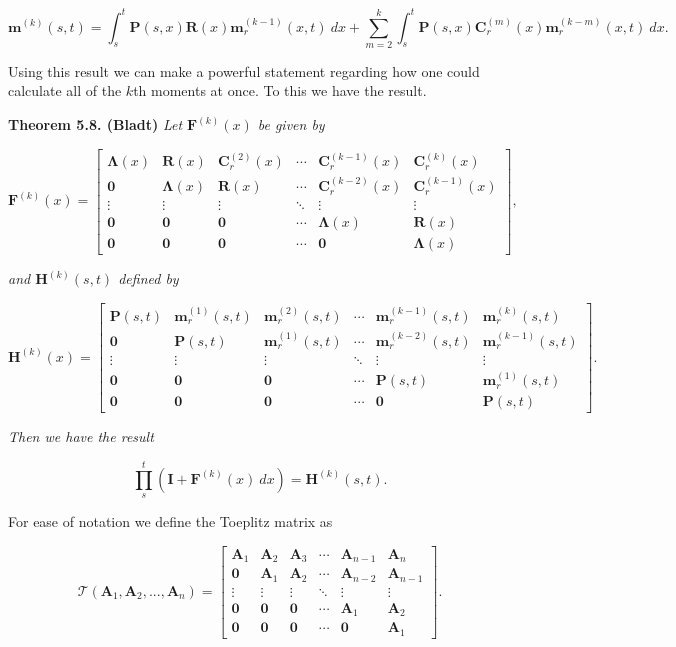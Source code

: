 \documentclass[a4paper,12pt,openany]{book}
\begin{document}
\[
\mathbf m^{(k)}(s,t)=\int_s^t\mathbf P(s,x)\mathbf R(x)\mathbf m^{(k-1)}_r(x,t)\ dx+\sum_{m=2}^k\int_s^t\mathbf P(s,x)\mathbf C^{(m)}_r(x)\mathbf m^{(k-m)}_r(x,t)\ dx.
\]

Using this result we can make a powerful statement regarding how one could calculate all of the \(k\)th moments at once. To this we have the result.

\textbf{Theorem 5.8. (Bladt)} \emph{Let \(\mathbf F^{(k)}(x)\) be given by}

\[
\mathbf F^{(k)}(x)=
\begin{bmatrix}
\mathbf \Lambda(x) & \mathbf R(x) & \mathbf C^{(2)}_r(x) & \cdots & \mathbf C^{(k-1)}_r(x) & \mathbf C^{(k)}_r(x)\\
\mathbf 0 & \mathbf \Lambda(x) & \mathbf R(x) & \cdots & \mathbf C^{(k-2)}_r(x) & \mathbf C^{(k-1)}_r(x)\\
\vdots & \vdots & \vdots & \ddots & \vdots & \vdots \\
\mathbf 0 & \mathbf 0 & \mathbf 0 & \cdots &\mathbf \Lambda(x) & \mathbf R(x)\\
\mathbf 0 & \mathbf 0 & \mathbf 0 & \cdots & \mathbf 0 &\mathbf \Lambda(x)
\end{bmatrix},
\]

\emph{and \(\mathbf H^{(k)}(s,t)\) defined by}

\[
\mathbf H^{(k)}(x)=
\begin{bmatrix}
\mathbf P(s,t) & \mathbf m_r^{(1)}(s,t) & \mathbf m_r^{(2)}(s,t) & \cdots & \mathbf m_r^{(k-1)}(s,t) & \mathbf m_r^{(k)}(s,t)\\
\mathbf 0 & \mathbf P(s,t) & \mathbf m_r^{(1)}(s,t) & \cdots & \mathbf m_r^{(k-2)}(s,t) & \mathbf m_r^{(k-1)}(s,t)\\
\vdots & \vdots & \vdots & \ddots & \vdots & \vdots \\
\mathbf 0 & \mathbf 0 & \mathbf 0 & \cdots & \mathbf P(s,t) & \mathbf m_r^{(1)}(s,t)\\
\mathbf 0 & \mathbf 0 & \mathbf 0 & \cdots & \mathbf 0 & \mathbf P(s,t)
\end{bmatrix}.
\]

\emph{Then we have the result}

\[
\prod_s^t(\mathbf I + \mathbf F^{(k)}(x)\ dx)=\mathbf H^{(k)}(s,t).
\]

For ease of notation we define the Toeplitz matrix as

\[
\mathcal T(\mathbf A_1,\mathbf A_2,...,\mathbf A_n)=
\begin{bmatrix}
\mathbf A_1 & \mathbf A_2 & \mathbf A_3 & \cdots & \mathbf A_{n-1} & \mathbf A_n\\
\mathbf 0 & \mathbf A_1 & \mathbf A_2 & \cdots & \mathbf A_{n-2} & \mathbf A_{n-1}\\
\vdots & \vdots & \vdots & \ddots & \vdots & \vdots \\
\mathbf 0 & \mathbf 0 & \mathbf 0 & \cdots & \mathbf A_1 & \mathbf A_2\\
\mathbf 0 & \mathbf 0 & \mathbf 0 & \cdots & \mathbf 0 & \mathbf A_1
\end{bmatrix}.
\]
\end{document}
